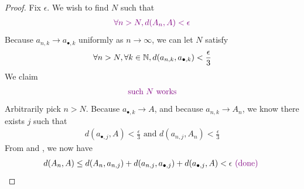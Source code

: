 \documentclass{report}
\begin{document}
\begin{proof}
Fix $\epsilon $. We wish to find $N$ such that 
 \begin{align*}
   \textcolor{violet}{\forall n>N, d(A_n,A)<\epsilon}
\end{align*}
Because  $a_{n,k}\to a_{\bullet,k}$ uniformly as $n \to \infty$, we can let $N$ satisfy 
\begin{align}
\label{K3}
\forall n>N,\forall k\in\mathbb{N}, d(a_{n,k},a_{\bullet,k})<\frac{\epsilon}{3}
\end{align}
We claim 
\begin{align*}
\textcolor{violet}{\text{ such $N$ works }}
\end{align*}
Arbitrarily pick $n>N$. Because $a_{\bullet,k} \to A$, and because $a_{n,k} \to A_n$, we know there exists $j$ such that 
 \begin{align}
  \label{K4}
d(a_{\bullet,j},A)<\frac{\epsilon}{3}\text{ and }d(a_{n,j},A_n)<\frac{\epsilon}{3}
\end{align}
From  and , we now have
\begin{align*}
d(A_n,A)\leq d(A_n,a_{n,j})+d(a_{n,j},a_{\bullet,j})+d(a_{\bullet,j},A)<\epsilon \textcolor{violet}{\text{ (done) }}
\end{align*}
\end{proof}
\end{document}
